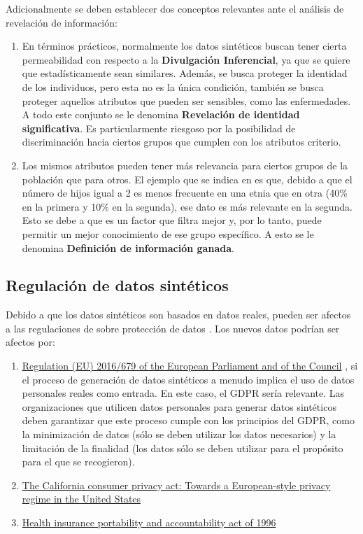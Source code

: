 Adicionalmente se deben establecer dos conceptos relevantes ante el análisis de revelación de información:
\begin{enumerate}
    \item En términos prácticos, normalmente los datos sintéticos buscan tener cierta permeabilidad con respecto a la \textbf{Divulgación Inferencial}, ya que se quiere que estadísticamente sean similares. Además, se busca proteger la identidad de los individuos, pero esta no es la única condición, también se busca proteger aquellos atributos que pueden ser sensibles, como las enfermedades. A todo este conjunto se le denomina \textbf{Revelación de identidad significativa}. Es particularmente riesgoso por la posibilidad de discriminación hacia ciertos grupos que cumplen con los atributos criterio.
    \item Los mismos atributos pueden tener más relevancia para ciertos grupos de la población que para otros. El ejemplo que se indica en \cite{el_emam_practical_2020} es que, debido a que el número de hijos igual a 2 es menos frecuente en una etnia que en otra (40\% en la primera y 10\% en la segunda), ese dato es más relevante en la segunda. Esto se debe a que es un factor que filtra mejor y, por lo tanto, puede permitir un mejor conocimiento de ese grupo específico. A esto se le denomina \textbf{Definición de información ganada}.
\end{enumerate}
\newpage

\subsection{Regulación de datos sintéticos}
Debido a que los datos sintéticos son basados en datos reales, pueden ser afectos a las regulaciones de sobre protección de datos \cite{bruce_practical_2020}. Los nuevos datos podrían ser afectos por:
\begin{enumerate}
    \item \href{https://dvbi.ru/Portals/0/DOCUMENTS_SHARE/RISK_MANAGEMENT/EBA/GDPR_eng_rus.pdf}{Regulation (EU) 2016/679 of the European Parliament and of the Council} \cite{regulation_regulation_2016}, si el proceso de generación de datos sintéticos a menudo implica el uso de datos personales reales como entrada. En este caso, el GDPR sería relevante. Las organizaciones que utilicen datos personales para generar datos sintéticos deben garantizar que este proceso cumple con los principios del GDPR, como la minimización de datos (sólo se deben utilizar los datos necesarios) y la limitación de la finalidad (los datos sólo se deben utilizar para el propósito para el que se recogieron).
    \item \href{https://heinonline.org/HOL/LandingPage?handle=hein.journals/jtlp23&div=5&id=&page=}{The California consumer privacy act: Towards a European-style privacy regime in the United States} \cite{pardau_california_2018}
    \item \href{http://www.eolusinc.com/pdf/hipaa.pdf}{Health insurance portability and accountability act of 1996} \cite{act_health_1996}
\end{enumerate}

